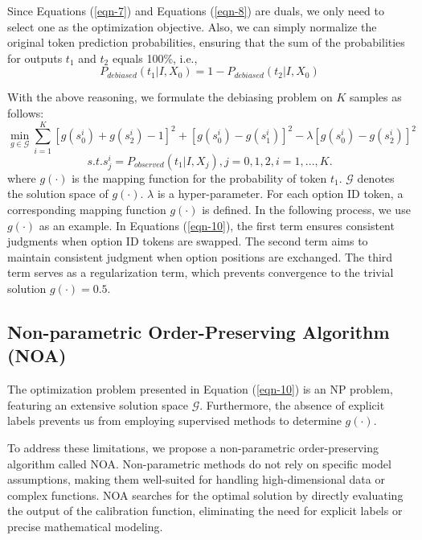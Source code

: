 \documentclass[sigconf]{acmart}
\begin{document}
Since Equations (\ref{eqn-7}) and Equations (\ref{eqn-8}) are duals, 
we only need to select one as the optimization objective.
Also, we can simply normalize the original token prediction probabilities, ensuring that the sum of the probabilities for outputs $t_1$ and $t_2$ equals 100\%, i.e.,
\begin{equation}\label{eqn-9} 
P_{debiased}(t_1|I,X_0) = 1 - P_{debiased}(t_2|I,X_0)
\end{equation}

With the above reasoning, we formulate the debiasing problem on $K$ samples as follows:
\begin{equation}\label{eqn-10} 
\min_{g\in \mathcal{G}}  \sum_{i=1}^{K}[ g(s_{0}^{i}) + g(s_2^i)-1]^2 +[ g(s_{0}^{i}) - g(s_1^i)]^2-\lambda[ g(s_{0}^{i}) - g(s_2^i)]^2
\end{equation}
\begin{equation}\label{eqn-11} 
s.t. s_{j}^{i} = P_{observed}(t_1|I,X_j), j={0,1,2}, i={1,...,K}.
\end{equation}
where $g(\cdot)$ is the mapping function for the probability of token $t_1$. $\mathcal{G}$ denotes the solution space of $g(\cdot)$.
$\lambda$ is a hyper-parameter.
For each option ID token,  a corresponding mapping function $g(\cdot)$ is defined. In the following process, we use $g(\cdot)$ as an example.
In Equations (\ref{eqn-10}), the first term ensures consistent judgments when option ID tokens are swapped. The second term aims to maintain consistent judgment when option positions are exchanged. The third term serves as a regularization term, which prevents convergence to the trivial solution $g(\cdot) = 0.5$.

\subsection{Non-parametric Order-Preserving  Algorithm (NOA)}
The optimization problem presented in Equation (\ref{eqn-10}) is an NP problem, featuring an extensive solution space $\mathcal{G}$. Furthermore, the absence of explicit labels prevents us from employing supervised methods to determine $g(\cdot)$.

To address these limitations, we propose a non-parametric order-preserving algorithm called NOA. Non-parametric methods do not rely on specific model assumptions, making them well-suited for handling high-dimensional data or complex functions.  NOA searches for the optimal solution by directly evaluating the output of the calibration function, eliminating the need for explicit labels or precise mathematical modeling.
\end{document}
